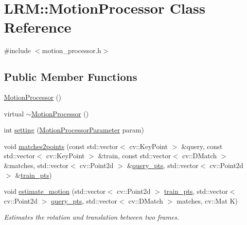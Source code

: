 \hypertarget{classLRM_1_1MotionProcessor}{\section{\-L\-R\-M\-:\-:\-Motion\-Processor \-Class \-Reference}
\label{classLRM_1_1MotionProcessor}
}


{\ttfamily \#include $<$motion\-\_\-processor.\-h$>$}

\subsection*{\-Public \-Member \-Functions}
\begin{DoxyCompactItemize}
\item 
\hyperlink{classLRM_1_1MotionProcessor_a76c8a7c000e36f3cb5c5f44b10440a85}{\-Motion\-Processor} ()
\item 
virtual \hyperlink{classLRM_1_1MotionProcessor_a465b73032fda5b158e0b0dc8f48080ff}{$\sim$\-Motion\-Processor} ()
\item 
int \hyperlink{classLRM_1_1MotionProcessor_a64c33eeeac78f7f8358c77daa4635689}{setting} (\hyperlink{classLRM_1_1MotionProcessorParameter}{\-Motion\-Processor\-Parameter} param)
\item 
void \hyperlink{classLRM_1_1MotionProcessor_a2fa4b7f533a12a88058a63b87ad96f4a}{matches2points} (const std\-::vector$<$ cv\-::\-Key\-Point $>$ \&query, const std\-::vector$<$ cv\-::\-Key\-Point $>$ \&train, const std\-::vector$<$ cv\-::\-D\-Match $>$ \&matches, std\-::vector$<$ cv\-::\-Point2d $>$ \&\hyperlink{classLRM_1_1MotionProcessor_af0e2f9ee5479177b49a6caf44962faff}{query\-\_\-pts}, std\-::vector$<$ cv\-::\-Point2d $>$ \&\hyperlink{classLRM_1_1MotionProcessor_ae72b3aea2c352caefb7f256a40ca6e31}{train\-\_\-pts})
\item 
void \hyperlink{classLRM_1_1MotionProcessor_a13ac0902eb981cacc1dee1a2d586362d}{estimate\-\_\-motion} (std\-::vector$<$ cv\-::\-Point2d $>$ \hyperlink{classLRM_1_1MotionProcessor_ae72b3aea2c352caefb7f256a40ca6e31}{train\-\_\-pts}, std\-::vector$<$ cv\-::\-Point2d $>$ \hyperlink{classLRM_1_1MotionProcessor_af0e2f9ee5479177b49a6caf44962faff}{query\-\_\-pts}, std\-::vector$<$ cv\-::\-D\-Match $>$ matches, cv\-::\-Mat \-K)
\begin{DoxyCompactList}\small\item\em \-Estimates the rotation and translation between two frames. \end{DoxyCompactList}\item 

\end{DoxyCompactItemize}

